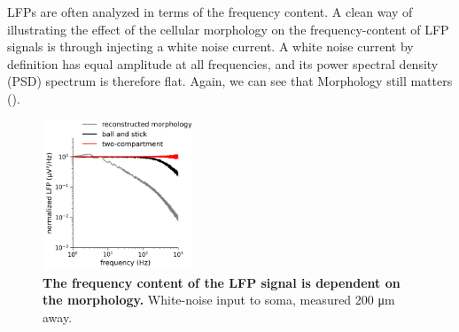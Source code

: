 LFPs are often analyzed in terms of the frequency content.
A clean way of illustrating the effect of the cellular morphology on the frequency-content of LFP signals
is through injecting a white noise current. A white noise current by definition has equal amplitude at all frequencies, and its power spectral density (PSD) spectrum is therefore flat.
Again, we can see that Morphology still matters ().

\begin{figure}[!ht]
\begin{center}
\includegraphics[width=0.4\textwidth]{Figures/LFP/fig_LFP_powerlaws_morphology.png}
\end{center}
\caption{\textbf{The frequency content of the LFP signal is dependent on the morphology.}
White-noise input to soma, measured 200 \si{\micro \metre} away.
}
\label{fig:LFP:morph_matters_PSD}
\end{figure}



\subsection{}
\label{subsec:LFP:intrinsic_dend_filt}

